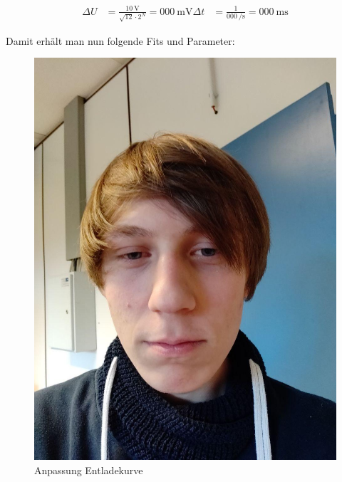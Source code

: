 \documentclass[12pt,twoside,a4paper]{scrartcl}
\begin{document}
				\begin{align}
					\label{Kondensator::Messfehler}
					\Delta U &= \frac{\SI{10}{\volt}}{\sqrt{12} \cdot 2^{N}} = \SI{000}{\milli \volt}
					\Delta t &= \frac{1}{\SI{000}{\per \second}} =  \SI{000}{\milli \second} %
				\end{align}

				Damit erhält man nun folgende Fits und Parameter:

				\begin{figure}
					\centering
					\begin{minipage}{0.4 \textwidth}
						\includegraphics[width = \textwidth]{Pictures/Platzhalter.jpg}
						\caption{Anpassung Entladekurve}
					\end{minipage}
					\begin{minipage}{0.4 \textwidth}

\end{minipage}
\end{figure}
\end{document}
